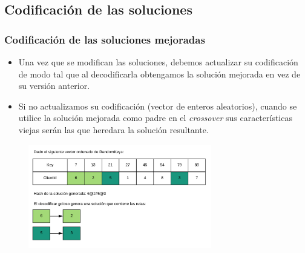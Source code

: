 \documentclass{beamer}
\begin{document}

\subsection{Codificación de las soluciones}

\begin{frame}
\frametitle{Codificación de las soluciones mejoradas}

\begin{itemize}
    \item Una vez que se modifican las soluciones, debemos actualizar su codificación de modo tal que al decodificarla obtengamos la solución mejorada en vez de su versión anterior.
    \pause
    \item Si no actualizamos su codificación (vector de enteros aleatorios), cuando se utilice la solución mejorada como padre en el \textit{crossover} sus características viejas serán las que heredara la solución resultante.
    \pause
\end{itemize}

\begin{figure}[h]
	\centering
	\includegraphics[width=8cm]{codificacionDeSolucionParteUno}
	\label{fig:codificacionDeSolucionParteUno}
\end{figure}

\end{frame}

\end{document}
